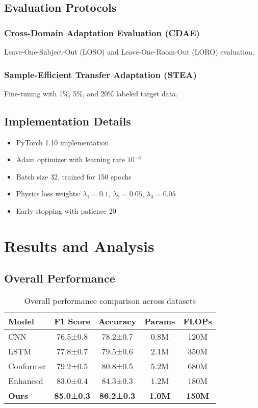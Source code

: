 \documentclass[10pt,conference]{IEEEtran}
\begin{document}
\subsection{Evaluation Protocols}

\subsubsection{Cross-Domain Adaptation Evaluation (CDAE)}
Leave-One-Subject-Out (LOSO) and Leave-One-Room-Out (LORO) evaluation.

\subsubsection{Sample-Efficient Transfer Adaptation (STEA)}
Fine-tuning with 1\%, 5\%, and 20\% labeled target data.

\subsection{Implementation Details}

\begin{itemize}
    \item PyTorch 1.10 implementation
    \item Adam optimizer with learning rate $10^{-3}$
    \item Batch size 32, trained for 150 epochs
    \item Physics loss weights: $\lambda_1=0.1$, $\lambda_2=0.05$, $\lambda_3=0.05$
    \item Early stopping with patience 20
\end{itemize}

\section{Results and Analysis}
\label{sec:results}

\subsection{Overall Performance}

\begin{table}[h]
\centering
\caption{Overall performance comparison across datasets}
\label{tab:overall}
\begin{tabular}{lcccc}
\toprule
Model & F1 Score & Accuracy & Params & FLOPs \\
\midrule
CNN & 76.5±0.8 & 78.2±0.7 & 0.8M & 120M \\
LSTM & 77.8±0.7 & 79.5±0.6 & 2.1M & 350M \\
Conformer & 79.2±0.5 & 80.8±0.5 & 5.2M & 680M \\
Enhanced & 83.0±0.4 & 84.3±0.3 & 1.2M & 180M \\
\textbf{Ours} & \textbf{85.0±0.3} & \textbf{86.2±0.3} & \textbf{1.0M} & \textbf{150M} \\
\bottomrule
\end{tabular}
\end{table}
\end{document}
